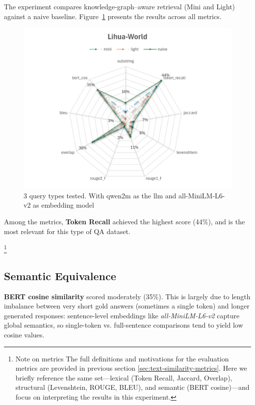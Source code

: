 The experiment compares knowledge-graph–aware retrieval (Mini and Light) against a naive baseline.
Figure~\ref{fig:Lihua-World} presents the results across all metrics.
\begin{figure}[H]
    \centering
    \includegraphics[width=1\linewidth]{Figures/Lihua-World.jpg}
    \caption{3 query types tested. With qwen2m as the llm and all-MiniLM-L6-v2 as embedding model}
    \label{fig:Lihua-World}
\end{figure}
Among the metrics, \textbf{Token Recall} achieved the highest score (44\%), and is the most relevant for this type of QA dataset.

\footnote{Note on metrics The full definitions and motivations for the evaluation metrics are provided in previous section \ref{sec:text-similarity-metrics}. Here we briefly reference the same set—lexical (Token Recall, Jaccard, Overlap), structural (Levenshtein, ROUGE, BLEU), and semantic (BERT cosine)—and focus on interpreting the results in this experiment.}

\subsection{Semantic Equivalence}
	\textbf{BERT cosine similarity} scored moderately (35\%). This is largely due to length imbalance between very short gold answers (sometimes a single token) and longer generated responses: sentence-level embeddings like \textit{all-MiniLM-L6-v2} capture global semantics, so single-token vs. full-sentence comparisons tend to yield low cosine values.

